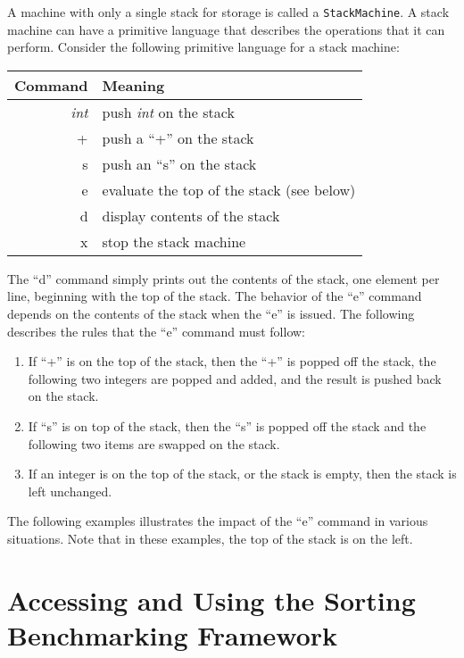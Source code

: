   
  A machine with only a single stack for storage is called a \texttt{StackMachine}. A stack machine can have a primitive
  language that describes the operations that it can perform. Consider the following primitive language for a stack
  machine:

\begin{tabular}{r | l}
Command & Meaning \\ \hline
\emph{int} & push \emph{int} on the stack \\
+ & push a ``+'' on the stack \\
s & push an ``s'' on the stack \\
e & evaluate the top of the stack (see below) \\
d & display contents of the stack \\
x & stop the stack machine \\ 
\end{tabular}

  The ``d'' command simply prints out the contents of the stack, one element per line, beginning with the top of the
  stack. The behavior of the ``e'' command depends on the contents of the stack when the ``e'' is issued. The following
  describes the rules that the ``e'' command must follow:

\begin{enumerate}

  \item If ``+'' is on the top of the stack, then the ``+'' is popped off the stack, the following two integers are popped
    and added, and the result is pushed back on the stack.  
  
  \item If ``s'' is on top of the stack, then the ``s'' is popped off the stack and the following two items are swapped
    on the stack.  
  
  \item If an integer is on the top of the stack, or the stack is empty, then the stack is left unchanged.  

\end{enumerate}

The following examples illustrates the impact of the ``e'' command in various situations. Note that in these examples,
the top of the stack is on the left.



\section*{Accessing and Using the Sorting Benchmarking Framework}

